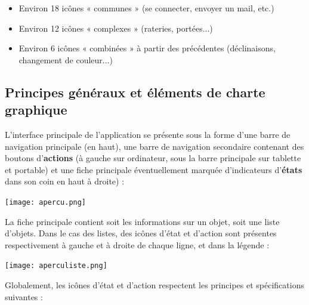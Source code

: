 \documentclass[a4paper,10pt]{article}
\begin{document}
\begin{itemize}
	\item Environ 18 icônes « communes » (se connecter, envoyer un mail, etc.)
	\item Environ 12 icônes « complexes » (rateries, portées...)
	\item Environ 6 icônes « combinées » à partir des précédentes (déclinaisons, changement de couleur...)
\end{itemize}
      
\subsection{Principes généraux et éléments de charte graphique}
L'interface principale de l'application se présente sous la forme d'une barre de navigation principale (en haut), une barre de navigation secondaire contenant des boutons d'\textbf{actions} (à gauche sur ordinateur, sous la barre principale sur tablette et portable) et une fiche principale éventuellement marquée d'indicateurs d'\textbf{états} dans son coin en haut à droite) :

\begin{center}
\texttt{[image: apercu.png]}
\end{center}

La fiche principale contient soit les informations sur un objet, soit une liste d'objets. Dans le cas des listes, des icônes d'état et d'action sont présentes respectivement à gauche et à droite de chaque ligne, et dans la légende :

\begin{center}
\texttt{[image: aperculiste.png]}
\end{center}

Globalement, les icônes d'état et d'action respectent les principes et spécifications suivantes :
\end{document}
